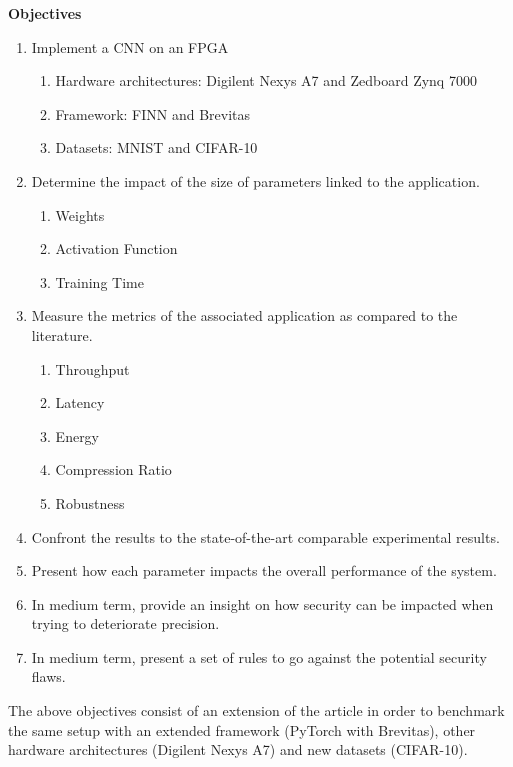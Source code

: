 \textbf{Objectives}

\begin{enumerate}
  \item Implement a CNN on an FPGA
  \begin{enumerate}
    \item Hardware architectures: Digilent Nexys A7 and Zedboard Zynq 7000
    \item Framework: FINN and Brevitas
    \item Datasets: MNIST and CIFAR-10
  \end{enumerate}
  \item Determine the impact of the size of parameters linked to the application.
  \begin{enumerate}
    \item Weights
    \item Activation Function
    \item Training Time
  \end{enumerate}
  \item Measure the metrics of the associated application as compared to the literature.
  \begin{enumerate}
    \item Throughput
    \item Latency
    \item Energy
    \item Compression Ratio
    \item Robustness
  \end{enumerate}
  \item Confront the results to the state-of-the-art comparable experimental results.
  \item Present how each parameter impacts the overall performance of the system.
  \item In medium term, provide an insight on how security can be impacted when trying to deteriorate precision.
  \item In medium term, present a set of rules to go against the potential security flaws.
\end{enumerate}

The above objectives consist of an extension of the \cite{Bacchus2020} article in order to benchmark the same setup with an extended framework (PyTorch with Brevitas), other hardware architectures (Digilent Nexys A7) and new datasets (CIFAR-10).


